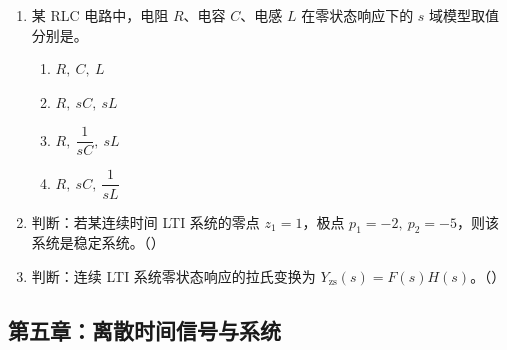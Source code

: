 \documentclass[12pt,a4paper]{ctexart}
\begin{document}
\begin{enumerate}[label=\arabic*.]
\item 某 RLC 电路中，电阻 $R$、电容 $C$、电感 $L$ 在零状态响应下的 $s$ 域模型取值分别是\underline{\hspace{3cm}}。
\begin{enumerate}[label=\Alph*.]
\item $R,\ C,\ L$
\item $R,\ sC,\ sL$
\item $R,\ \dfrac{1}{sC},\ sL$
\item $R,\ sC,\ \dfrac{1}{sL}$
\end{enumerate}

\item 判断：若某连续时间 LTI 系统的零点 $z_1=1$，极点 $p_1=-2,\ p_2=-5$，则该系统是稳定系统。\quad（\qquad）

\item 判断：连续 LTI 系统零状态响应的拉氏变换为 \(\displaystyle Y_{\mathrm{zs}}(s)=F(s)H(s)\)。（\qquad）
\end{enumerate}

\subsection{第五章：离散时间信号与系统}
\end{document}
